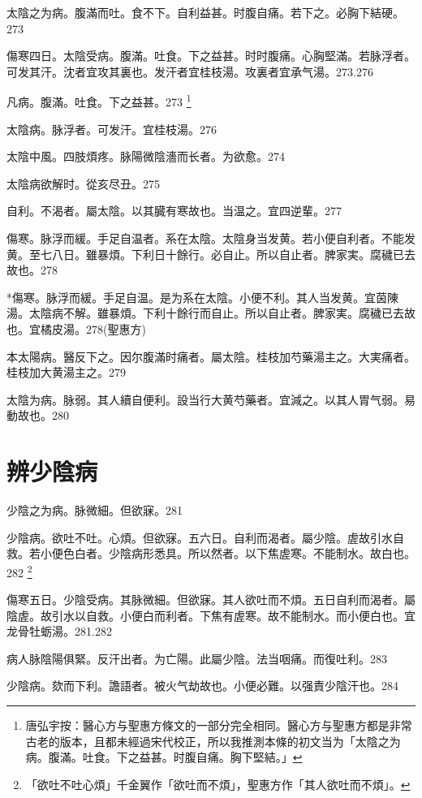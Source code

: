 太陰之为病。腹滿而吐。食不下。自利益甚。时腹自痛。若下之。必胸下結硬。{\zhaoben}273

傷寒四日。太陰受病。腹滿。吐食。下之益甚。时时腹痛。心胸堅滿。若脉浮者。可发其汗。沈者宜攻其裏也。发汗者宜桂枝湯。攻裏者宜承气湯。{\gaoben}273.276

凡病。腹滿。吐食。下之益甚。{\yixin}273
	\footnote{唐弘宇按：醫心方与聖惠方條文的一部分完全相同。醫心方与聖惠方都是非常古老的版本，且都未經過宋代校正，所以我推測本條的初文当为「太陰之为病。腹滿。吐食。下之益甚。时腹自痛。胸下堅結。」}

太陰病。脉浮者。可发汗。宜桂枝湯。276

太陰中風。四肢煩疼。{\khaaitp 脉}陽微陰濇而长者。为欲愈。274

太陰病欲解时。從亥尽丑。275

自利。不渴者。屬太陰。以其臓有寒故也。当温之。宜四逆輩。277

傷寒。脉浮而緩。手足自温者。系在太陰。太陰{\khaaitp 身}当发黄。若小便自利者。不能发黄。至七八日。雖暴煩。下利日十餘行。必自止。所以自止者。脾家実。腐穢已去故也。278

*傷寒。脉浮而緩。手足自温。是为系在太陰。小便不利。其人当发黄。宜茵陳湯。太陰病不解。雖暴煩。下利十餘行而自止。所以自止者。脾家実。腐穢已去故也。宜橘皮湯。278(聖惠方)

{\khaaitp 本}太陽病。醫反下之。因尔腹滿时痛者。屬太陰。桂枝加芍藥湯主之。大実痛者。桂枝加大黄湯主之。279

太陰为病。脉弱。其人續自便利。設当行大黄芍藥者。宜減之。以其人胃气弱。易動故也。280

\chapter{辨少陰病}

少陰之为病。脉微細。但欲寐。281

少陰病。欲吐不吐。心煩。但欲寐。五六日。自利而渴者。屬少陰。虗故引水自救。若小便色白者。少陰病形悉具。所以然者。以下焦虗寒。不能制水。故白也。282
	\footnote{「欲吐不吐心煩」千金翼作「欲吐而不煩」，聖惠方作「其人欲吐而不煩」。}

傷寒五日。少陰受病。其脉微細。但欲寐。其人欲吐而不煩。五日自利而渴者。屬陰虗。故引水以自救。小便白而利者。下焦有虗寒。故不能制水。而小便白也。宜龙骨牡蛎湯。{\gaoben}281.282

病人脉陰陽俱緊。反汗出者。为亡陽。此屬少陰。法当咽痛。而復吐利。283

少陰病。欬而下利。譫語者。被火气劫故也。小便必難。以强責少陰汗也。284

